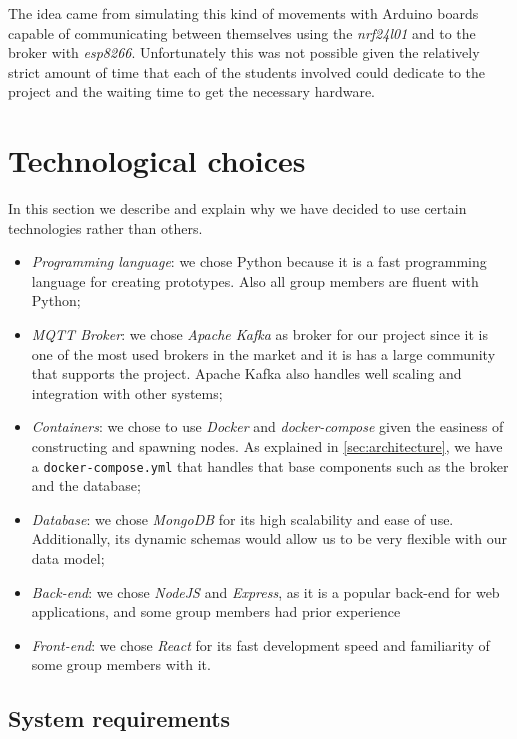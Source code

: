 \documentclass[conference]{IEEEtran}
\begin{document}
	The idea came from simulating this kind of movements with Arduino boards capable of communicating between themselves using the \textit{nrf24l01} and to the broker with \textit{esp8266}.
	Unfortunately this was not possible given the relatively strict amount of time that each of the students involved could dedicate to the project and the waiting time to get the necessary hardware.

\section{Technological choices}\label{sec:technological_choices}

	In this section we describe and explain why we have decided to use certain technologies rather than others.
	
	\begin{itemize}
		\item \textit{Programming language}: we chose Python because it is a fast programming language for creating prototypes. Also all group members are fluent with Python;
		\item \textit{MQTT Broker}: we chose \textit{Apache Kafka} as broker for our project since it is one of the most used brokers in the market and it is has a large community that supports the project. Apache Kafka also handles well scaling and integration with other systems;
		\item \textit{Containers}: we chose to use \textit{Docker} and \textit{docker-compose} given the easiness of constructing and spawning nodes. As explained in \ref{sec:architecture}, we have a \texttt{docker-compose.yml} that handles that base components such as the broker and the database;
		\item \textit{Database}: we chose \textit{MongoDB} for its high scalability and ease of use. Additionally, its dynamic schemas would allow us to be very flexible with our data model;
		\item \textit{Back-end}: we chose \textit{NodeJS} and \textit{Express}, as it is a popular back-end for web applications, and some group members had prior experience
		\item \textit{Front-end}: we chose \textit{React} for its fast development speed and familiarity of some group members with it.
	\end{itemize}

	\subsection{System requirements}
	
\end{document}
